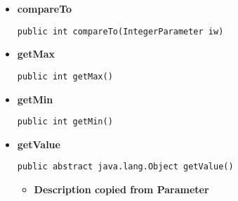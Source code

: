 {{{{{{{{\begin{itemize}
{\begin{itemize}
{Let the visitor visit this parameter.
}
\item{
{\bf  Parameters}
  \begin{itemize}
   \item{
\texttt{visitor} -- The visitor to visit}
  \end{itemize}
}%
\end{itemize}
}%
\item{ 
{\bf  compareTo}\\
\begin{lstlisting}[frame=none]
public int compareTo(IntegerParameter iw)\end{lstlisting} %
}%
\item{ 
{\bf  getMax}\\
\begin{lstlisting}[frame=none]
public int getMax()\end{lstlisting} %
}%
\item{ 
{\bf  getMin}\\
\begin{lstlisting}[frame=none]
public int getMin()\end{lstlisting} %
}%
\item{ 
{\bf  getValue}\\
\begin{lstlisting}[frame=none]
public abstract java.lang.Object getValue()\end{lstlisting} %
\begin{itemize}
\item{
{\bf  Description copied from Parameter{\small {}} }

}
\end{itemize}}
\end{itemize}}}}}}}}}
